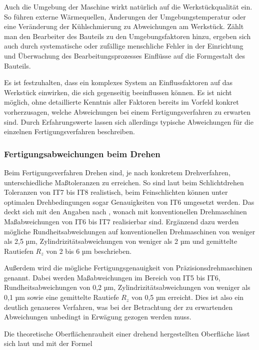 Auch die Umgebung der Maschine wirkt natürlich auf die Werkstückqualität ein. So führen externe Wärmequellen, Änderungen der Umgebungstemperatur oder eine Veränderung der Kühlschmierung zu Abweichungen am Werkstück. Zählt man den Bearbeiter des Bauteils zu den Umgebungsfaktoren hinzu, ergeben sich auch durch systematische oder zufällige menschliche Fehler in der Einrichtung und Überwachung des Bearbeitungsprozesses Einflüsse auf die Formgestalt des Bauteils. 

Es ist festzuhalten, dass ein komplexes System an Einflussfaktoren auf das Werkstück einwirken, die sich gegenseitig beeinflussen können. Es ist nicht möglich, ohne detaillierte Kenntnis aller Faktoren bereits im Vorfeld konkret vorherzusagen, welche Abweichungen bei einem Fertigungsverfahren zu erwarten sind. Durch Erfahrungswerte lassen sich allerdings typische Abweichungen für die einzelnen Fertigungsverfahren beschreiben. 

\subsubsection {Fertigungsabweichungen beim Drehen}

Beim Fertigungsverfahren Drehen sind, je nach konkretem Drehverfahren, unterschiedliche Maßtoleranzen zu erreichen. So sind laut \cite{Dietrich.2014} beim Schlichtdrehen Toleranzen von IT7 bis IT8 realistisch, beim Feinschlichten können unter optimalen Drehbedingungen sogar Genauigkeiten von IT6 umgesetzt werden. Das deckt sich mit den Angaben nach \cite{Denkena.2011}, wonach mit konventionellen Drehmaschinen Maßabweichungen von IT6 bis IT7 realisierbar sind. Ergänzend dazu werden mögliche Rundheitsabweichungen auf konventionellen Drehmaschinen von weniger als 2,5 µm, Zylindrizitätsabweichungen von weniger als 2 µm und gemittelte Rautiefen $R_{z}$ von 2 bis 6 µm beschrieben. 

Außerdem wird die mögliche Fertigungsgenauigkeit von Präzisionsdrehmaschinen genannt. Dabei werden Maßabweichungen im Bereich von IT5 bis IT6, Rundheitsabweichungen von 0,2 µm, Zylindrizitätsabweichungen von weniger als 0,1 µm sowie eine gemittelte Rautiefe $R_{z}$ von 0,5 µm erreicht. Dies ist also ein deutlich genaueres Verfahren, was bei der Betrachtung der zu erwartenden Abweichungen unbedingt in Erwägung gezogen werden muss. 

Die theoretische Oberflächenrauheit einer drehend hergestellten Oberfläche lässt sich laut \cite{Dietrich.2014} und \cite{Paucksch.2008} mit der Formel 

